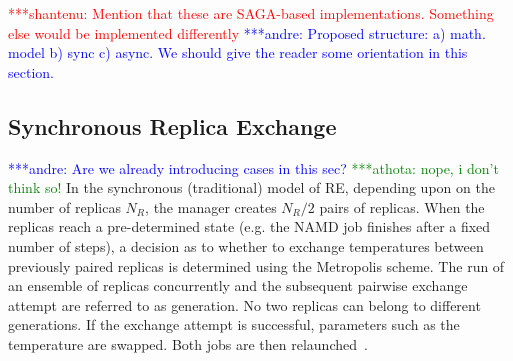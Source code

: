 \documentclass{rspublic}
\newcommand{\jhanote}[1]{ {\textcolor{red} { ***shantenu: #1 }}}
\newcommand{\alnote}[1]{ {\textcolor{blue} { ***andre: #1 }}}
\newcommand{\athotanote}[1]{ {\textcolor{green} { ***athota: #1 }}}
\newcommand{\alnote}[1]{}
\newcommand{\athotanote}[1]{}
\newcommand{\jhanote}[1]{}
\begin{document}



\jhanote{Mention that these are SAGA-based implementations. Something
  else would be implemented differently}
\alnote{Proposed structure: a) math. model b) sync c) async. We should give the reader some orientation in this section.}

\subsection{Synchronous Replica Exchange}

\alnote{Are we already introducing cases in this sec?} \athotanote{nope, i don't think so!}
In the synchronous (traditional) model of RE, depending upon
on the number of replicas ${N_R}$, the manager creates ${N_R/2}$ pairs
of replicas. When the replicas reach a
pre-determined state (e.g. the NAMD job finishes after a fixed number
of steps), a decision as to whether to exchange temperatures between
previously paired replicas is determined using the Metropolis scheme.
The run of an ensemble of replicas concurrently and the subsequent
pairwise exchange attempt are referred to as generation. No two
replicas can belong to different generations. If the exchange attempt
is successful, parameters such as the temperature are swapped. Both
jobs are then relaunched~\citep{Luckow:2008fp}.
\end{document}
